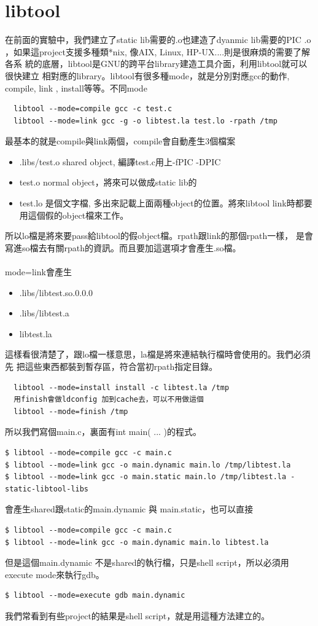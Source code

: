   \section{libtool}
  在前面的實驗中，我們建立了static lib需要的.o也建造了dyanmic lib需要的PIC .o
  ，如果這project支援多種類*nix, 像AIX, Linux, HP-UX....則是很麻煩的需要了解各系
  統的底層，libtool是GNU的跨平台library建造工具介面，利用libtool就可以很快建立
  相對應的library。libtool有很多種mode，就是分別對應gcc的動作, compile, link
  , install等等。不同mode
  \begin{verbatim}
  libtool --mode=compile gcc -c test.c
  libtool --mode=link gcc -g -o libtest.la test.lo -rpath /tmp
  \end{verbatim}
  最基本的就是compile與link兩個，compile會自動產生3個檔案
  \begin{itemize}
    \item .libs/test.o shared object, 編譯test.c用上-fPIC -DPIC
    \item test.o normal object，將來可以做成static lib的
    \item test.lo 是個文字檔, 多出來記載上面兩種object的位置。將來libtool
      link時都要用這個假的object檔來工作。
  \end{itemize}
  所以lo檔是將來要pass給libtool的假object檔。rpath跟link的那個rpath一樣，
  是會寫進so檔去有關rpath的資訊。而且要加這選項才會產生.so檔。
  \\\\
  mode=link會產生
  \begin{itemize}
    \item .libs/libtest.so.0.0.0
    \item .libs/libtest.a
    \item libtest.la
  \end{itemize}
  這樣看很清楚了，跟lo檔一樣意思，la檔是將來連結執行檔時會使用的。我們必須先
  把這些東西都裝到暫存區，符合當初rpath指定目錄。
  \begin{verbatim}
  libtool --mode=install install -c libtest.la /tmp
  用finish會做ldconfig 加到cache去，可以不用做這個
  libtool --mode=finish /tmp
  \end{verbatim}
  所以我們寫個main.c，裏面有int main( ... )的程式。
  \begin{verbatim}
$ libtool --mode=compile gcc -c main.c
$ libtool --mode=link gcc -o main.dynamic main.lo /tmp/libtest.la
$ libtool --mode=link gcc -o main.static main.lo /tmp/libtest.la -static-libtool-libs
  \end{verbatim}
  會產生shared跟static的main.dynamic 與 main.static，也可以直接
  \begin{verbatim}
$ libtool --mode=compile gcc -c main.c
$ libtool --mode=link gcc -o main.dynamic main.lo libtest.la
  \end{verbatim}
  但是這個main.dynamic 不是shared的執行檔，只是shell script，所以必須用execute
  mode來執行gdb。
  \begin{verbatim}
$ libtool --mode=execute gdb main.dynamic
  \end{verbatim}
  我們常看到有些project的結果是shell script，就是用這種方法建立的。

